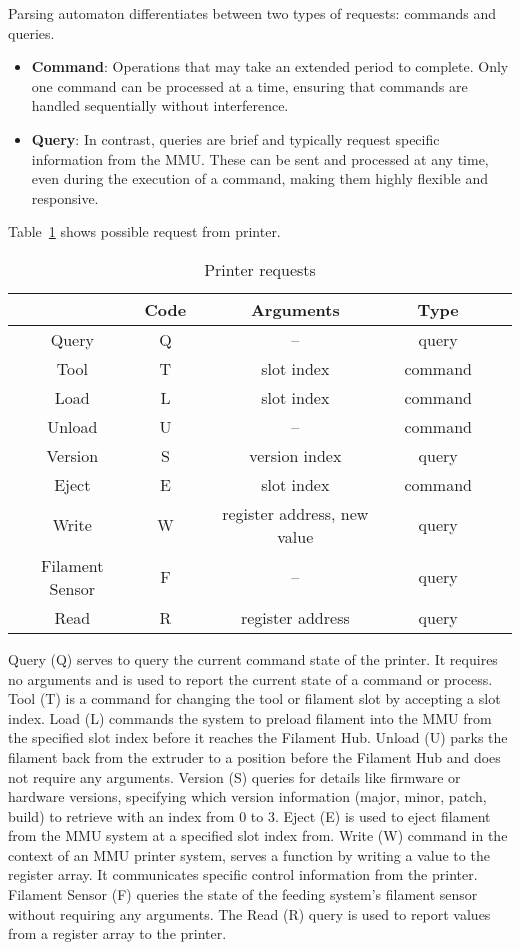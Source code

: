 Parsing automaton differentiates between two types of requests: commands and queries.

\begin{itemize}
    \item \textbf{Command}: Operations that may take an extended period to complete. Only one command can be processed at a time, ensuring that commands are handled sequentially without interference. 
    \item \textbf{Query}: In contrast, queries are brief and typically request specific information from the MMU. These can be sent and processed at any time, even during the execution of a command, making them highly flexible and responsive.
\end{itemize}

Table~\ref{tab:aaaa} shows possible request from printer.

\begin{table}[ht]
    \centering
    \caption{Printer requests}
    \begin{tabular}{|c|c|c|c|c|c|}
        \hline
	& \textbf{Code}  & \textbf{Arguments} & \textbf{Type}  \\
        \hline
	Query & Q & -- & query \\
        \hline
	Tool & T & slot index & command \\
        \hline
        Load & L & slot index & command \\
        \hline
	Unload & U & -- & command \\
        \hline
	Version & S & version index & query \\
        \hline
	Eject & E & slot index & command \\
        \hline
	Write & W & register address, new value & query \\
        \hline
	Filament Sensor & F & -- & query \\
        \hline
	Read & R & register address & query \\
        \hline
    \end{tabular}
    \label{tab:aaaa}
\end{table}

Query (Q) serves to query the current command state of the printer. It requires no arguments and is used to report the current state of a command or process. Tool (T) is a command for changing the tool or filament slot by accepting a slot index. Load (L) commands the system to preload filament into the MMU from the specified slot index before it reaches the Filament Hub. Unload (U) parks the filament back from the extruder to a position before the Filament Hub and does not require any arguments. Version (S) queries for details like firmware or hardware versions, specifying which version information (major, minor, patch, build) to retrieve with an index from 0 to 3. Eject (E) is used to eject filament from the MMU system at a specified slot index from. Write (W) command in the context of an MMU printer system, serves a  function by writing a value to the register array. It communicates specific control information from the printer. Filament Sensor (F) queries the state of the feeding system’s filament sensor without requiring any arguments. The Read (R) query is used to report values from a register array to the printer.

